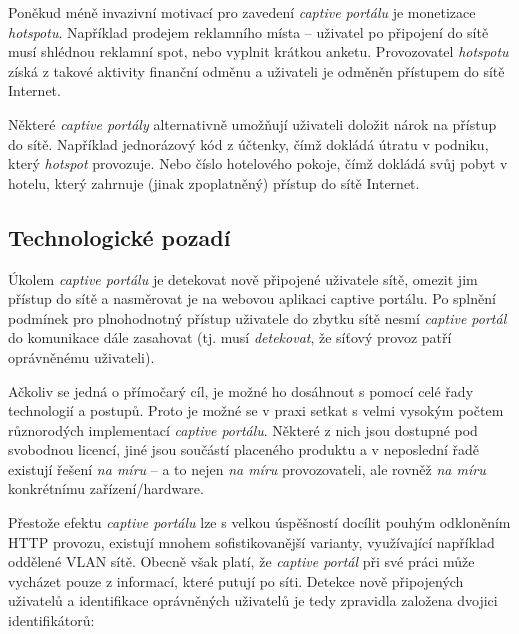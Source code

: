 \documentclass[thesis=M,czech]{FITthesis}[2012/10/20]
\begin{document}
Poněkud méně invazivní motivací pro zavedení \textit{captive portálu} je monetizace \textit{hotspotu}. Například prodejem reklamního místa -- uživatel po připojení do sítě musí shlédnou reklamní spot, nebo vyplnit krátkou anketu. Provozovatel \textit{hotspotu} získá z takové aktivity finanční odměnu a uživateli je odměněn přístupem do sítě Internet.

Některé \textit{captive portály} alternativně umožňují uživateli doložit nárok na přístup do sítě. Například jednorázový kód z účtenky, čímž dokládá útratu v podniku, který \textit{hotspot} provozuje. Nebo číslo hotelového pokoje, čímž dokládá svůj pobyt v hotelu, který zahrnuje (jinak zpoplatněný) přístup do sítě Internet.

\subsection{Technologické pozadí}
\label{subsec:technologicke-pozadi}


Úkolem \textit{captive portálu} je detekovat nově připojené uživatele sítě, omezit jim přístup do sítě a nasměrovat je na webovou aplikaci captive portálu. Po splnění podmínek pro plnohodnotný přístup uživatele do zbytku sítě nesmí \textit{captive portál} do komunikace dále zasahovat (tj. musí \textit{detekovat}, že síťový provoz patří oprávněnému uživateli).

Ačkoliv se jedná o přímočarý cíl, je možné ho dosáhnout s pomocí celé řady technologií a postupů. Proto je možné se v praxi setkat s velmi vysokým počtem různorodých implementací \textit{captive portálu}. Některé z nich jsou dostupné pod svobodnou licencí, jiné jsou součástí placeného produktu a v neposlední řadě existují řešení \textit{na míru} -- a to nejen \textit{na míru} provozovateli, ale rovněž \textit{na míru} konkrétnímu zařízení/hardware. 

Přestože efektu \textit{captive portálu} lze s velkou úspěšností docílit pouhým odkloněním HTTP provozu, existují mnohem sofistikovanější varianty, využívající například oddělené VLAN sítě. Obecně však platí, že \textit{captive portál} při své práci může vycházet pouze z informací, které putují po síti. Detekce nově připojených uživatelů a identifikace oprávněných uživatelů je tedy zpravidla založena dvojici identifikátorů:
\end{document}

